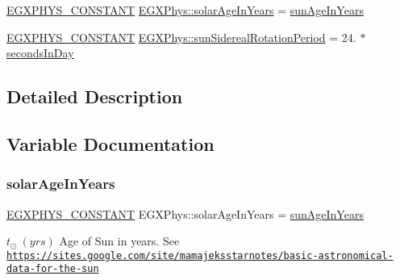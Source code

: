 \begin{DoxyCompactItemize}
\item 
\mbox{\hyperlink{group___e_g_x_phys-_constants-_macros_ga76980d288494ce1714c9ac68a95ba702}{E\+G\+X\+P\+H\+Y\+S\+\_\+\+C\+O\+N\+S\+T\+A\+NT}} \mbox{\hyperlink{group___e_g_x_phys-_constants-_astrophysics-_solar_system-_sun-_bulk_ga51282485762d0d1f23a15ac028bbdc47}{E\+G\+X\+Phys\+::solar\+Age\+In\+Years}} = \mbox{\hyperlink{group___e_g_x_phys-_constants-_astrophysics-_solar_system-_sun-_bulk_ga940159140fc0eb1f661748d424b26b51}{sun\+Age\+In\+Years}}
\item 
\mbox{\hyperlink{group___e_g_x_phys-_constants-_macros_ga76980d288494ce1714c9ac68a95ba702}{E\+G\+X\+P\+H\+Y\+S\+\_\+\+C\+O\+N\+S\+T\+A\+NT}} \mbox{\hyperlink{group___e_g_x_phys-_constants-_astrophysics-_solar_system-_sun-_bulk_gaa33e0ded1617772d751ab5f473db3fbd}{E\+G\+X\+Phys\+::sun\+Sidereal\+Rotation\+Period}} = 24. $\ast$ \mbox{\hyperlink{namespace_e_g_x_phys_a93d2a00d75411b58cbf63ab3fd1f8bc2}{seconds\+In\+Day}}
\end{DoxyCompactItemize}


\subsection{Detailed Description}


\subsection{Variable Documentation}
\mbox{\label{group___e_g_x_phys-_constants-_astrophysics-_solar_system-_sun-_bulk_ga51282485762d0d1f23a15ac028bbdc47}} 
\subsubsection{\texorpdfstring{solar\+Age\+In\+Years}{solarAgeInYears}}
{\footnotesize\ttfamily \mbox{\hyperlink{group___e_g_x_phys-_constants-_macros_ga76980d288494ce1714c9ac68a95ba702}{E\+G\+X\+P\+H\+Y\+S\+\_\+\+C\+O\+N\+S\+T\+A\+NT}} E\+G\+X\+Phys\+::solar\+Age\+In\+Years = \mbox{\hyperlink{group___e_g_x_phys-_constants-_astrophysics-_solar_system-_sun-_bulk_ga940159140fc0eb1f661748d424b26b51}{sun\+Age\+In\+Years}}}

$t_{\odot} \ (yrs)$ Age of Sun in years. See \href{https://sites.google.com/site/mamajeksstarnotes/basic-astronomical-data-for-the-sun}{\tt https\+://sites.\+google.\+com/site/mamajeksstarnotes/basic-\/astronomical-\/data-\/for-\/the-\/sun} \mbox{\label{group___e_g_x_phys-_constants-_astrophysics-_solar_system-_sun-_bulk_ga8191a2e8a7ea11325ec2eaec4ad7de4d}} 
